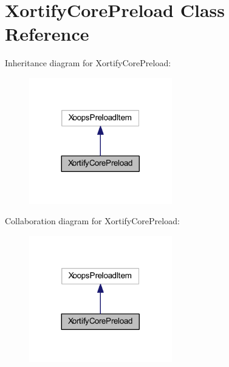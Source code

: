 \hypertarget{class_xortify_core_preload}{\section{Xortify\-Core\-Preload Class Reference}
\label{class_xortify_core_preload}
}


Inheritance diagram for Xortify\-Core\-Preload\-:
\nopagebreak
\begin{figure}[H]
\begin{center}
\leavevmode
\includegraphics[width=176pt]{class_xortify_core_preload__inherit__graph}
\end{center}
\end{figure}


Collaboration diagram for Xortify\-Core\-Preload\-:
\nopagebreak
\begin{figure}[H]
\begin{center}
\leavevmode
\includegraphics[width=176pt]{class_xortify_core_preload__coll__graph}
\end{center}
\end{figure}
